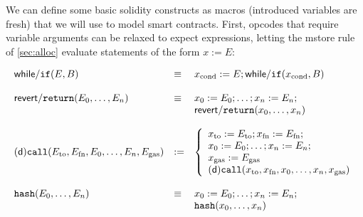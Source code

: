 \documentclass[12pt]{extarticle}
\begin{document}
We can define some basic solidity constructs as macros (introduced variables are fresh) that we will use to model smart contracts.
First, opcodes that require variable arguments can be relaxed to expect expressions, letting the \textsf{mstore} rule of \autoref{sec:alloc} evaluate statements of the form $x:=E$:

$$ \begin{array} {lll}
\mathsf{while}/\mathtt{if}(E,B) &\equiv& x_\textrm{cond} := E; \mathsf{while}/\mathtt{if}(x_\textrm{cond},B)\\\\
\mathsf{revert}/\mathtt{return}(E_0,\dots,E_n) &\equiv& x_0:=E_0; \dots; x_n:=E_n;\\
&& \mathsf{revert}/\mathtt{return}(x_0,\dots,x_n)\\\\
\mathsf{(d)}\mathtt{call}(E_\textrm{to},E_{\textrm{fn}},E_0,\dots,E_n,E_{\textrm{gas}}) &:=& \left\{
\begin{array}{l}
x_\textrm{to} := E_\textrm{to};x_\textrm{fn} := E_\textrm{fn}; \\
x_0 := E_0; \dots; x_n := E_n; \\
x_\textrm{gas} := E_\textrm{gas}\\
\mathsf{(d)}\mathtt{call}(x_\textrm{to},x_\textrm{fn},x_0,\dots,x_n,x_\textrm{gas})
\end{array}\right. \\\\
\mathtt{hash}(E_0,\dots, E_n) &\equiv&  x_0:=E_0; \dots; x_n:=E_n;\\
&& \mathtt{hash}(x_0,\dots,x_n)
\end{array}
$$
\end{document}
